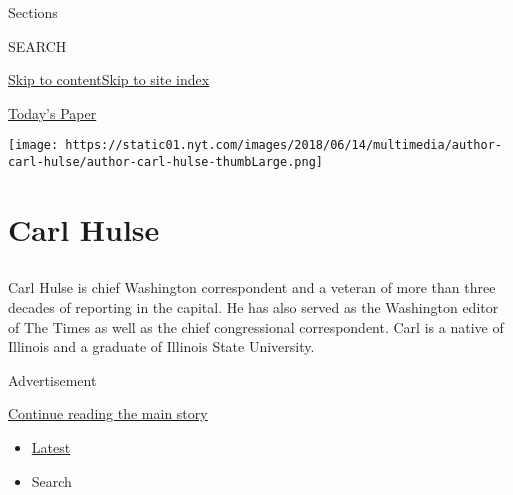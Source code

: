Sections

SEARCH

\protect\hyperlink{site-content}{Skip to
content}\protect\hyperlink{site-index}{Skip to site index}

\href{https://myaccount.nytimes.com/auth/login?response_type=cookie\&client_id=vi}{}

\href{https://www.nytimes.com/section/todayspaper}{Today's Paper}

\texttt{[image: https://static01.nyt.com/images/2018/06/14/multimedia/author-carl-hulse/author-carl-hulse-thumbLarge.png]}

\hypertarget{carl-hulse}{%
\section{Carl Hulse}\label{carl-hulse}}

\subsection{}

Carl Hulse is chief Washington correspondent and a veteran of more than
three decades of reporting in the capital. He has also served as the
Washington editor of The Times as well as the chief congressional
correspondent. Carl is a native of Illinois and a graduate of Illinois
State University.~

Advertisement

\protect\hyperlink{after-mid1}{Continue reading the main story}

\begin{itemize}
\tightlist
\item
  \protect\hyperlink{stream-panel}{Latest}
\item
  Search
\end{itemize}

